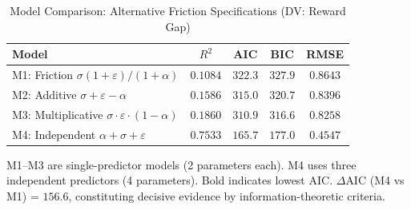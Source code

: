 \begin{table}[ht]
\centering
\caption{Model Comparison: Alternative Friction Specifications (DV: Reward Gap)}
\label{tab:marl-model-comparison}
\begin{tabular}{@{}lcccc@{}}
\toprule
\textbf{Model} & \textbf{$R^2$} & \textbf{AIC} & \textbf{BIC} & \textbf{RMSE} \\
\midrule
M1: Friction $\sigma(1+\varepsilon)/(1+\alpha)$ & $0.1084$ & $322.3$ & $327.9$ & $0.8643$ \\
M2: Additive $\sigma + \varepsilon - \alpha$ & $0.1586$ & $315.0$ & $320.7$ & $0.8396$ \\
M3: Multiplicative $\sigma \cdot \varepsilon \cdot (1 - \alpha)$ & $0.1860$ & $310.9$ & $316.6$ & $0.8258$ \\
M4: Independent $\alpha + \sigma + \varepsilon$ & $0.7533$ & \textbf{$165.7$} & $177.0$ & $0.4547$ \\
\bottomrule
\end{tabular}
\begin{tablenotes}
\small
\item M1--M3 are single-predictor models (2 parameters each). M4 uses three independent predictors (4 parameters). Bold indicates lowest AIC. $\Delta$AIC (M4 vs M1) = $156.6$, constituting decisive evidence by information-theoretic criteria.
\end{tablenotes}
\end{table}
